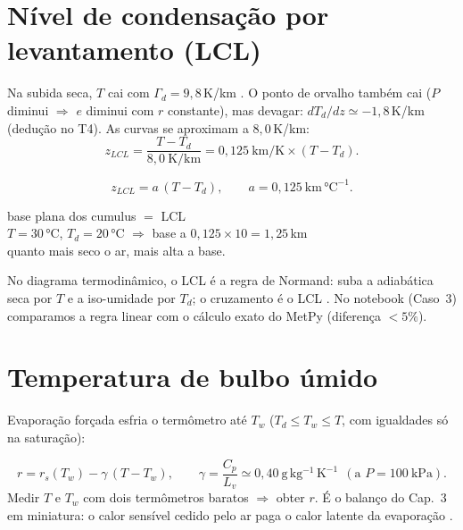 \documentclass[11pt]{article}
\begin{document}
\section{Nível de condensação por levantamento (LCL)}\label{sec:lcl}


\begin{formadif}
Na subida seca, $T$ cai com $\Gamma_d = 9{,}8$\,K/km
. O ponto de orvalho também cai
($P$ diminui $\Rightarrow$ $e$ diminui com $r$ constante), mas devagar:
$dT_d/dz \simeq -1{,}8$\,K/km (dedução no T4). As curvas se aproximam a
$8{,}0$\,K/km:
\[ z_{LCL} = \frac{T - T_d}{8{,}0\ \mathrm{K/km}}
 = 0{,}125\ \mathrm{km/K}\times (T - T_d). \]
\end{formadif}

\begin{formalivro}[Stull eq.~4.16]
\[ z_{LCL} = a\,(T - T_d),\qquad a = 0{,}125\ \mathrm{km\,°C^{-1}}. \]
\end{formalivro}

\begin{noquadro}
base plana dos cumulus $=$ LCL\\[2pt]
$T = 30\,°$C, $T_d = 20\,°$C $\Rightarrow$ base a
$0{,}125\times10 = 1{,}25$\,km\\[2pt]
quanto mais seco o ar, mais alta a base.
\end{noquadro}

No diagrama termodinâmico, o LCL é a regra de Normand: suba a adiabática
seca por $T$ e a iso-umidade por $T_d$; o cruzamento é o LCL
. No notebook (Caso~3)
comparamos a regra linear com o cálculo exato do MetPy (diferença
$<5\%$).

\section{Temperatura de bulbo úmido}

Evaporação forçada esfria o termômetro até $T_w$
($T_d \le T_w \le T$, com igualdades só na saturação):

\begin{formalivro}
\[ r = r_s(T_w) - \gamma\,(T - T_w),\qquad
\gamma = \frac{C_p}{L_v} \simeq 0{,}40\ \mathrm{g\,kg^{-1}\,K^{-1}}
\ \ (\text{a } P = 100\ \mathrm{kPa}). \]
Medir $T$ e $T_w$ com dois termômetros baratos $\Rightarrow$ obter $r$.
É o balanço do Cap.~3 em miniatura: o calor sensível cedido pelo ar paga o
calor latente da evaporação .
\end{formalivro}
\end{document}
